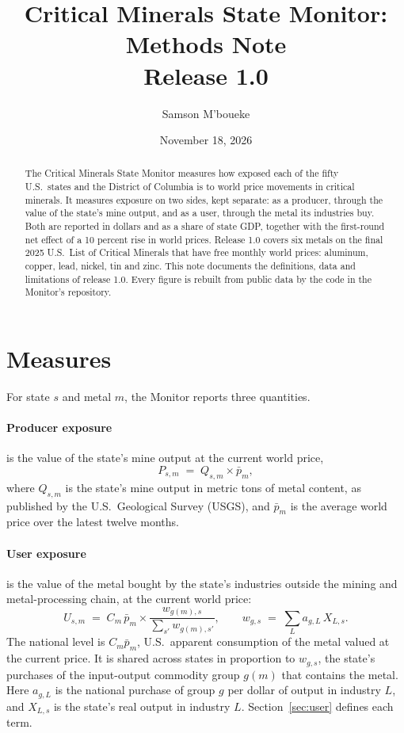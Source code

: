 \documentclass[11pt]{article}
\title{\textbf{Critical Minerals State Monitor: Methods Note}\\[0.3em]\large Release 1.0}
\author{Samson M'boueke}
\date{November 18, 2026}
\begin{document}
\maketitle

\begin{abstract}
\noindent The Critical Minerals State Monitor measures how exposed each of the fifty U.S.\
states and the District of Columbia is to world price movements in critical minerals. It
measures exposure on two sides, kept separate: as a producer, through the value of the
state's mine output, and as a user, through the metal its industries buy. Both are reported
in dollars and as a share of state GDP, together with the first-round net effect of a 10
percent rise in world prices. Release 1.0 covers six metals on the final 2025 U.S.\ List of
Critical Minerals that have free monthly world prices: aluminum, copper, lead, nickel, tin
and zinc. This note documents the definitions, data and limitations of release 1.0. Every
figure is rebuilt from public data by the code in the Monitor's repository.
\end{abstract}

\section{Measures}

For state $s$ and metal $m$, the Monitor reports three quantities.

\paragraph{Producer exposure} is the value of the state's mine output at the current world
price,
\begin{equation}
  P_{s,m} \;=\; Q_{s,m} \times \bar p_m ,
  \label{eq:producer}
\end{equation}
where $Q_{s,m}$ is the state's mine output in metric tons of metal content, as published by
the U.S.\ Geological Survey (USGS), and $\bar p_m$ is the average world price over the latest
twelve months.

\paragraph{User exposure} is the value of the metal bought by the state's industries outside
the mining and metal-processing chain, at the current world price:
\begin{equation}
  U_{s,m} \;=\; C_m \,\bar p_m \times
  \frac{w_{g(m),s}}{\sum_{s'} w_{g(m),s'}},
  \qquad
  w_{g,s} \;=\; \sum_{L} a_{g,L}\, X_{L,s} .
  \label{eq:user}
\end{equation}
The national level is $C_m \bar p_m$, U.S.\ apparent consumption of the metal valued at the
current price. It is shared across states in proportion to $w_{g,s}$, the state's purchases of
the input-output commodity group $g(m)$ that contains the metal. Here $a_{g,L}$ is the
national purchase of group $g$ per dollar of output in industry $L$, and $X_{L,s}$ is the
state's real output in industry $L$. Section~\ref{sec:user} defines each term.
\end{document}
